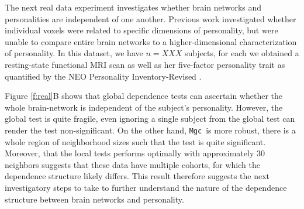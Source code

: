 \documentclass[11pt]{article}
\newcommand{\note}[2][]{\added[#1,remark={#2}]{}}
\providecommand{\sct}[1]{{\sc \texttt{#1}}}
\newcommand{\Migraine}{\sct{Migraine}}
\newcommand{\mtg}{\sct{m2g}}
\newcommand{\Mgc}{\sct{Mgc}}
\newcommand{\cs}[1]{{\note{cs: #1}}}
\begin{document}
The next real data experiment investigates whether brain networks and personalities are independent of one another. Previous work \cite{AdelsteinEtAl2011} investigated whether individual voxels were related to specific dimensions of personality, but were unable to compare entire brain networks to a higher-dimensional characterization of personality. 
In this dataset, we have $n=XXX$ \cs{please fix} subjects, for each we obtained a resting-state functional MRI scan as well as her five-factor personality trait as quantified by  the NEO Personality Inventory-Revised  \cite{Costa1992}. \cs{how many subjects? which atlas did we use? how did we represent the data? what metric did we use for each view? etc.}  

 Figure \ref{f:real}B shows that  global dependence tests can ascertain whether the whole brain-network is independent of the subject's personality.  However, the global test is quite fragile, even ignoring a single subject from the global test can render the test non-significant.  On the other hand, \Mgc~is more robust, there is a whole region of neighborhood sizes such that the test is quite significant.  Moreover, that the local tests performs optimally with approximately 30 neighbors suggests that these data have multiple cohorts, for which the dependence structure likely differs.  This result therefore suggests  the next investigatory steps to take to further understand the nature of the dependence structure between brain networks and personality.




\end{document}
